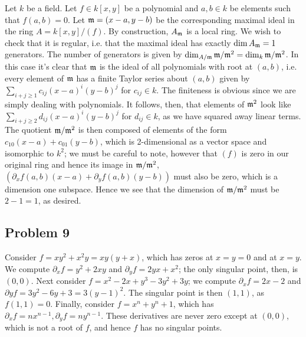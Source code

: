 \documentclass{../../mathnotes}
\begin{document}
Let $k$ be a field. Let $f\in k[x,y]$ be a polynomial and $a,b\in k$ be elements such that $f(a,b)=0$.
Let $\mathfrak m=(x-a,y-b)$ be the corresponding maximal ideal in the ring $A=k[x,y]/(f)$. By construction, $A_\mathfrak m$ is a local ring.
We wish to check that it is regular, i.e. that the maximal ideal has exactly $\dim A_\mathfrak m=1$ generators. The number of generators is given
by $\dim_{A/\mathfrak m}\mathfrak m/\mathfrak m^2=\dim_k\mathfrak m/\mathfrak m^2$. In this case it's clear that $\mathfrak m$ is the ideal of all polynomials with root
at $(a,b)$, i.e. every element of $\mathfrak m$ has a finite Taylor series about $(a,b)$ given by $\sum_{i+j\geq 1}c_{ij}(x-a)^i(y-b)^j$ for $c_{ij}\in k$.
The finiteness is obvious since we are simply dealing with polynomials.
It follows, then, that elements of $\mathfrak m^2$ look like $\sum_{i+j\geq 2}d_{ij}(x-a)^i(y-b)^j$ for $d_{ij}\in k$, as we have squared away linear terms.
The quotient $\mathfrak m/\mathfrak m^2$ is then composed of elements of the form $c_{10}(x-a)+c_{01}(y-b)$, which is 2-dimensional as a vector space and isomorphic to $k^2$;
we must be careful to note, however that $(f)$
is zero in our original ring and hence its image in $\mathfrak m/\mathfrak m^2$, $(\partial_x f(a,b)(x-a)+\partial_y f(a,b)(y-b))$ must also be zero, which is a dimension one subspace. Hence we see that
the dimension of $\mathfrak m/\mathfrak m^2$ must be $2-1=1$, as desired.


\subsection*{Problem 9}

Consider $f=xy^2+x^2y=xy(y+x)$, which has zeros at $x=y=0$ and at $x=y$. We compute $\partial_xf=y^2+2xy$ and $\partial_yf=2yx+x^2$; the only singular point, then,
is $(0,0)$. Next consider $f=x^2-2x+y^3-3y^2+3y$; we compute $\partial_xf=2x-2$ and $\partial yf=3y^2-6y+3=3(y-1)^2$. The singular point is then $(1,1)$,
as $f(1,1)=0$. Finally, consider $f=x^n+y^n+1$, which has $\partial_xf=nx^{n-1}, \partial_yf=ny^{n-1}$. These derivatives are never zero except at $(0,0)$, which
is not a root of $f$, and hence $f$ has no singular points.
\end{document}
